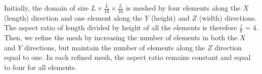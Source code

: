 \documentclass[12pt]{article}
\begin{document}
Initially, the domain of size $L \times \frac{L}{16} \times \frac{L}{16}$ is
meshed by four elements along the $X$ (length) direction and one element along
the $Y$ (height) and $Z$ (width) directions. The aspect ratio of length divided
by height of all the elements is therefore $\frac{l}{h}=4$. Then, we refine the
mesh by increasing the number of elements in both the $X$ and $Y$ directions,
but maintain the number of elements along the $Z$ direction equal to one. In
each refined mesh, the aspect ratio remains constant and equal to four for all
elements.

\begin{figure}[htbp]
  \begin{center}
    \unitlength=1.0mm

\end{center}
\end{figure}
\end{document}
